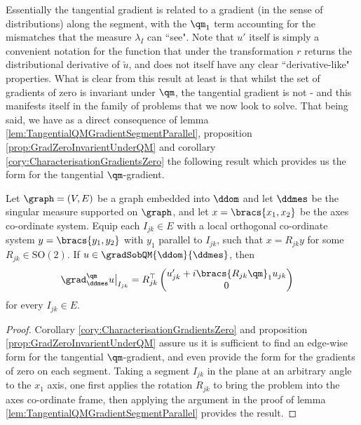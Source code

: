 Essentially the tangential gradient is related to a gradient (in the sense of distributions) along the segment, with the $\qm_1$ term accounting for the mismatches that the measure $\lambda_I$ can ``see".
Note that $u'$ itself is simply a convenient notation for the function that under the transformation $r$ returns the distributional derivative of $\widetilde{u}$, and does not itself have any clear ``derivative-like" properties.
What is clear from this result at least is that whilst the set of gradients of zero is invariant under $\qm$, the tangential gradient is not - and this manifests itself in the family of problems that we now look to solve.
That being said, we have as a direct consequence of lemma \ref{lem:TangentialQMGradientSegmentParallel}, proposition \ref{prop:GradZeroInvarientUnderQM} and corollary \ref{cory:CharacterisationGradientsZero} the following result which provides us the form for the tangential $\qm$-gradient.

\begin{cory} \label{cory:TangentialQMGradientGraphs}
	Let $\graph=(V,E)$ be a graph embedded into $\ddom$ and let $\ddmes$ be the singular measure supported on $\graph$, and let $x=\bracs{x_1,x_2}$ be the axes co-ordinate system.
	Equip each $I_{jk}\in E$ with a local orthogonal co-ordinate system $y=\bracs{y_1,y_2}$ with $y_1$ parallel to $I_{jk}$, such that $x = R_{jk}y$ for some $R_{jk}\in\mathrm{SO}(2)$.
	If $u\in\gradSobQM{\ddom}{\ddmes}$, then
	\begin{align*}
		\grad_\ddmes^\qm u \big\vert_{I_{jk}} &= R_{jk}^\top \begin{pmatrix} u_{jk}' + i\bracs{R_{jk}\qm}_1 u_{jk} \\ 0 \end{pmatrix}
	\end{align*}
	for every $I_{jk}\in E$.
\end{cory}
\begin{proof}
	Corollary \ref{cory:CharacterisationGradientsZero} and proposition \ref{prop:GradZeroInvarientUnderQM} assure us it is sufficient to find an edge-wise form for the tangential $\qm$-gradient, and even provide the form for the gradients of zero on each segment.
	Taking a segment $I_{jk}$ in the plane at an arbitrary angle to the $x_1$ axis, one first applies the rotation $R_{jk}$ to bring the problem into the axes co-ordinate frame, then applying the argument in the proof of lemma \ref{lem:TangentialQMGradientSegmentParallel} provides the result.
\end{proof}

